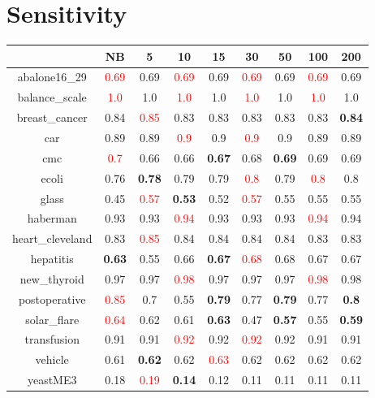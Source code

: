 \documentclass{article}%
\begin{document}
\section*{Sensitivity}%
\begin{tabular}{c|cccccccc}%
\hline%
&NB&5&10&15&30&50&100&200\\%
\hline%
abalone16\_29&\textcolor{red}{ 
0.69
}&0.69&\textcolor{red}{ 
0.69
}&0.69&\textcolor{red}{ 
0.69
}&0.69&\textcolor{red}{ 
0.69
}&0.69\\%
\hline%
balance\_scale&\textcolor{red}{ 
1.0
}&1.0&\textcolor{red}{ 
1.0
}&1.0&\textcolor{red}{ 
1.0
}&1.0&\textcolor{red}{ 
1.0
}&1.0\\%
\hline%
breast\_cancer&0.84&\textcolor{red}{ 
0.85
}&0.83&0.83&0.83&0.83&0.83&\textbf{0.84}\\%
\hline%
car&0.89&0.89&\textcolor{red}{ 
0.9
}&0.9&\textcolor{red}{ 
0.9
}&0.9&0.89&0.89\\%
\hline%
cmc&\textcolor{red}{ 
0.7
}&0.66&0.66&\textbf{0.67}&0.68&\textbf{0.69}&0.69&0.69\\%
\hline%
ecoli&0.76&\textbf{0.78}&0.79&0.79&\textcolor{red}{ 
0.8
}&0.79&\textcolor{red}{ 
0.8
}&0.8\\%
\hline%
glass&0.45&\textcolor{red}{ 
0.57
}&\textbf{0.53}&0.52&\textcolor{red}{ 
0.57
}&0.55&0.55&0.55\\%
\hline%
haberman&0.93&0.93&\textcolor{red}{ 
0.94
}&0.93&0.93&0.93&\textcolor{red}{ 
0.94
}&0.94\\%
\hline%
heart\_cleveland&0.83&\textcolor{red}{ 
0.85
}&0.84&0.84&0.84&0.84&0.83&0.83\\%
\hline%
hepatitis&\textbf{0.63}&0.55&0.66&\textbf{0.67}&\textcolor{red}{ 
0.68
}&0.68&0.67&0.67\\%
\hline%
new\_thyroid&0.97&0.97&\textcolor{red}{ 
0.98
}&0.97&0.97&0.97&\textcolor{red}{ 
0.98
}&0.98\\%
\hline%
postoperative&\textcolor{red}{ 
0.85
}&0.7&0.55&\textbf{0.79}&0.77&\textbf{0.79}&0.77&\textbf{0.8}\\%
\hline%
solar\_flare&\textcolor{red}{ 
0.64
}&0.62&0.61&\textbf{0.63}&0.47&\textbf{0.57}&0.55&\textbf{0.59}\\%
\hline%
transfusion&0.91&0.91&\textcolor{red}{ 
0.92
}&0.92&\textcolor{red}{ 
0.92
}&0.92&0.91&0.91\\%
\hline%
vehicle&0.61&\textbf{0.62}&0.62&\textcolor{red}{ 
0.63
}&0.62&0.62&0.62&0.62\\%
\hline%
yeastME3&0.18&\textcolor{red}{ 
0.19
}&\textbf{0.14}&0.12&0.11&0.11&0.11&0.11\\%

\end{tabular}
\end{document}

